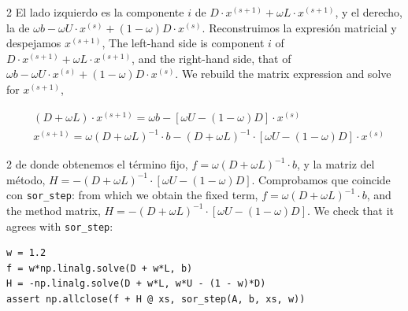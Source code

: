 \begin{paracol}{2}
El lado izquierdo es la componente $i$ de $D\cdot x^{(s+1)} + \omega L\cdot x^{(s+1)}$, y el derecho, la de $\omega b - \omega U\cdot x^{(s)} + (1-\omega)D\cdot x^{(s)}$. Reconstruimos la expresión matricial y despejamos $x^{(s+1)}$,
\switchcolumn
The left-hand side is component $i$ of $D\cdot x^{(s+1)} + \omega L\cdot x^{(s+1)}$, and the right-hand side, that of $\omega b - \omega U\cdot x^{(s)} + (1-\omega)D\cdot x^{(s)}$. We rebuild the matrix expression and solve for $x^{(s+1)}$,
\end{paracol}
\begin{align*}
	&(D + \omega L)\cdot x^{(s+1)} = \omega b - [\omega U - (1 - \omega)D]\cdot x^{(s)}\\
	&x^{(s+1)} = \omega (D + \omega L)^{-1}\cdot b - (D + \omega L)^{-1}\cdot[\omega U - (1 - \omega)D]\cdot x^{(s)}
\end{align*}
\begin{paracol}{2}
de donde obtenemos el término fijo, $f = \omega (D+\omega L)^{-1}\cdot b$, y la matriz del método, $H = -(D+ \omega L)^{-1}\cdot[\omega U -(1- \omega)D]$. Comprobamos que coincide con \texttt{sor\_step}:
\switchcolumn
from which we obtain the fixed term, $f = \omega (D+\omega L)^{-1}\cdot b$, and the method matrix, $H = -(D+ \omega L)^{-1}\cdot[\omega U -(1- \omega)D]$. We check that it agrees with \texttt{sor\_step}:
\end{paracol}

\begin{verbatim}
w = 1.2
f = w*np.linalg.solve(D + w*L, b)
H = -np.linalg.solve(D + w*L, w*U - (1 - w)*D)
assert np.allclose(f + H @ xs, sor_step(A, b, xs, w))
\end{verbatim}

